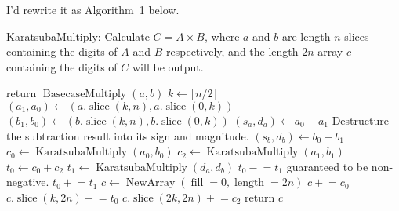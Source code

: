 \documentclass{computer-arithmetic}
\begin{document}
I'd rewrite it as Algorithm~1 below.

\begin{algorithm}
  \caption{KaratsubaMultiply: Calculate \(C = A × B\), where \(a\) and
    \(b\) are length-\(n\) slices containing the digits of \(A\) and
    \(B\) respectively, and the length-\(2n\) array \(c\) containing
    the digits of \(C\) will be output.}
\begin{algorithmic}[1]
    \State return $\operatorname{BasecaseMultiply}(a, b)$
\EndIf
\State $k ← \lceil n / 2 \rceil$
\State \((a_1, a_0) ← (a.\operatorname{slice}(k, n), a.\operatorname{slice}(0, k))\)
\State \((b_1, b_0) ← (b.\operatorname{slice}(k, n), b.\operatorname{slice}(0, k))\)
\State \((s_a, d_a) ← a_0 - a_1\)
\Comment Destructure the subtraction result into its sign and magnitude.
\State \((s_b, d_b) ← b_0 - b_1\)
\State \(c_0 ← \operatorname{KaratsubaMultiply}(a_0, b_0)\)
\State \(c_2 ← \operatorname{KaratsubaMultiply}(a_1, b_1)\)
\State \(t_0 ← c_0 + c_2\)
\State \(t_1 ← \operatorname{KaratsubaMultiply}(d_a, d_b)\)
\State \(t_0 \mathrel{-}= t_1\)
\Comment guaranteed to be non-negative.
\Else
\State \(t_0 \mathrel{+}= t_1\)
\EndIf
\State \(c ← \operatorname{NewArray}(\operatorname{fill}=0, \operatorname{length}=2n)\)
\State \(c \mathrel{+}= c_0\)
\State \(c.\operatorname{slice}(k, 2n) \mathrel{+}= t_0\)
\State \(c.\operatorname{slice}(2k, 2n) \mathrel{+}= c_2\)
\State return \(c\)
\end{algorithmic}
\end{algorithm}


\begin{solution}
\end{solution}
\end{document}

